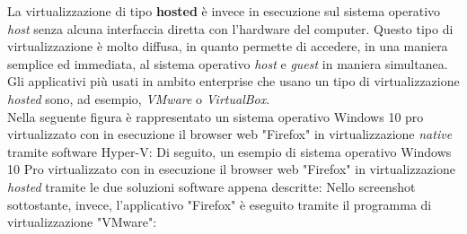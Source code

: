 La virtualizzazione di tipo \textbf{hosted} è invece in esecuzione sul sistema operativo \textit{host} senza alcuna interfaccia diretta con l'hardware del computer. Questo tipo di virtualizzazione è molto diffusa, in quanto permette di accedere, in una maniera semplice ed immediata, al sistema operativo \textit{host} e \textit{guest} in maniera simultanea. Gli applicativi più usati in ambito enterprise che usano un tipo di virtualizzazione \textit{hosted} sono, ad esempio, \textit{VMware} o \textit{VirtualBox}.\\
Nella seguente figura è rappresentato un sistema operativo Windows 10 pro virtualizzato con in esecuzione il browser web "Firefox" in virtualizzazione \textit{native} tramite software Hyper-V:
Di seguito, un esempio di sistema operativo Windows 10 Pro virtualizzato con in esecuzione il browser web "Firefox" in virtualizzazione \textit{hosted} tramite le due soluzioni software appena descritte:
Nello screenshot sottostante, invece, l'applicativo "Firefox" è eseguito tramite il programma di virtualizzazione "VMware":


